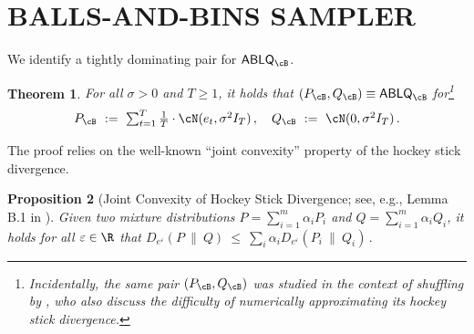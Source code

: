 \documentclass[twoside]{article}
\newtheorem{theorem}{Theorem}[section]
\newtheorem{proposition}[theorem]{Proposition}
\theoremstyle{definition}
\newcommand{\eps}{\varepsilon}
\newcommand{\ABLQ}{\mathsf{ABLQ}}
\newcommand{\ABLQB}{\ABLQ_{\cB}}
\newcommand{\PB}{P_{\cB}}
\newcommand{\QB}{Q_{\cB}}
\begin{document}
\section{BALLS-AND-BINS SAMPLER}\label{sec:bnb}
\vspace{-2mm}

We identify a tightly dominating pair for $\ABLQB$.

\begin{theorem}\label{thm:bnb-dominating-pair}
For all $\sigma > 0$ and $T \ge 1$, it holds that $(\PB, \QB) \equiv \ABLQB$ for\footnote{Incidentally, the same pair $(\PB, \QB)$ was studied in the context of shuffling by \cite{koskela23numerical}, who also discuss the difficulty of numerically approximating its hockey stick divergence.}
\[\textstyle
\PB ~:=~ \sum_{t=1}^T \frac1T \cdot \cN(e_t, \sigma^2 I_T)\,,\quad 
\QB ~:=~ \cN(0, \sigma^2 I_T)\,.
\]
\end{theorem}

The proof relies on the well-known ``joint convexity'' property of the hockey stick divergence.

\begin{proposition}[Joint Convexity of Hockey Stick Divergence; see, e.g., Lemma B.1 in \cite{chua24private}]\label{prop:joint-convexity}
Given two mixture distributions $P = \sum_{i=1}^m \alpha_i P_i$ and $Q = \sum_{i=1}^m \alpha_i Q_i$, it holds for all $\eps \in \R$ that
$D_{e^\eps}(P ~\|~ Q) ~\le~ \sum_i \alpha_i D_{e^\eps}(P_i ~\|~ Q_i)\,.$
\end{proposition}
\end{document}
